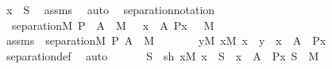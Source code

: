 \begin{isabellebody}
\ {\isachardoublequoteopen}x\ {\isasymin}\ S{\isachardoublequoteclose}\ \isamarkupfalse%
\ assms\ \isamarkupfalse%
\ auto\ \isanewline
{}\isamarkupfalse%
%
\endisatagproof
{\isafoldproof}%
%
\isadelimproof
\isanewline
%
\endisadelimproof
\isanewline
{}\isamarkupfalse%
\ separation{\isacharunderscore}{\kern0pt}notation\ {\isacharcolon}{\kern0pt}\ \isanewline
\ \ {\isachardoublequoteopen}separation{\isacharparenleft}{\kern0pt}{\isacharhash}{\kern0pt}{\isacharhash}{\kern0pt}M{\isacharcomma}{\kern0pt}\ P{\isacharparenright}{\kern0pt}\ {\isasymLongrightarrow}\ A\ {\isasymin}\ M\ {\isasymLongrightarrow}\ {\isacharbraceleft}{\kern0pt}\ x\ {\isasymin}\ A{\isachardot}{\kern0pt}\ P{\isacharparenleft}{\kern0pt}x{\isacharparenright}{\kern0pt}\ {\isacharbraceright}{\kern0pt}\ {\isasymin}\ M{\isachardoublequoteclose}\ \isanewline
%
\isadelimproof
%
\endisadelimproof
%
\isatagproof
{}\isamarkupfalse%
\ {\isacharminus}{\kern0pt}\ \isanewline
\ \ \isamarkupfalse%
\ assms\ {\isacharcolon}{\kern0pt}\ {\isachardoublequoteopen}separation{\isacharparenleft}{\kern0pt}{\isacharhash}{\kern0pt}{\isacharhash}{\kern0pt}M{\isacharcomma}{\kern0pt}\ P{\isacharparenright}{\kern0pt}{\isachardoublequoteclose}\ {\isachardoublequoteopen}A\ {\isasymin}\ M{\isachardoublequoteclose}\ \ \isanewline
\ \ \isamarkupfalse%
\ \isamarkupfalse%
\ {\isachardoublequoteopen}{\isasymexists}y{\isacharbrackleft}{\kern0pt}{\isacharhash}{\kern0pt}{\isacharhash}{\kern0pt}M{\isacharbrackright}{\kern0pt}{\isachardot}{\kern0pt}\ {\isasymforall}x{\isacharbrackleft}{\kern0pt}{\isacharhash}{\kern0pt}{\isacharhash}{\kern0pt}M{\isacharbrackright}{\kern0pt}{\isachardot}{\kern0pt}\ {\isacharparenleft}{\kern0pt}x\ {\isasymin}\ y\ {\isasymlongleftrightarrow}\ x\ {\isasymin}\ A\ {\isasymand}\ P{\isacharparenleft}{\kern0pt}x{\isacharparenright}{\kern0pt}{\isacharparenright}{\kern0pt}{\isachardoublequoteclose}\ \isamarkupfalse%
\ separation{\isacharunderscore}{\kern0pt}def\ \isamarkupfalse%
\ auto\ \isanewline
\ \ \isamarkupfalse%
\ \isamarkupfalse%
\ S\ \ sh{\isacharcolon}{\kern0pt}\ {\isachardoublequoteopen}{\isasymforall}x{\isacharbrackleft}{\kern0pt}{\isacharhash}{\kern0pt}{\isacharhash}{\kern0pt}M{\isacharbrackright}{\kern0pt}{\isachardot}{\kern0pt}\ {\isacharparenleft}{\kern0pt}x\ {\isasymin}\ S\ {\isasymlongleftrightarrow}\ x\ {\isasymin}\ A\ {\isasymand}\ P{\isacharparenleft}{\kern0pt}x{\isacharparenright}{\kern0pt}{\isacharparenright}{\kern0pt}{\isachardoublequoteclose}\ {\isachardoublequoteopen}S\ {\isasymin}\ M{\isachardoublequoteclose}\ \isamarkupfalse%

\end{isabellebody}
